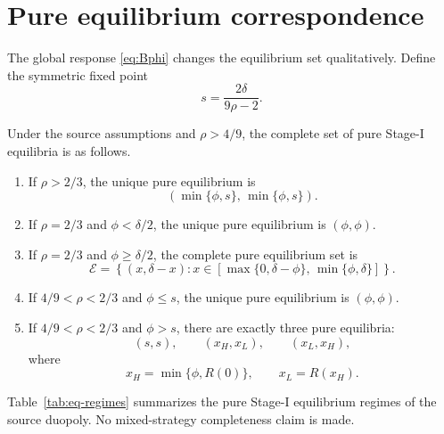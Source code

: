 \section{Pure equilibrium correspondence}
\label{sec:equilibrium}

The global response \eqref{eq:Bphi} changes the equilibrium set qualitatively.  Define the symmetric fixed point
\begin{equation}
s=\frac{2\delta}{9\rho-2}.
\label{eq:s}
\end{equation}

\begin{proposition}
\label{prop:correspondence}
Under the source assumptions and \(\rho>4/9\), the complete set of pure Stage-I equilibria is as follows.
\begin{enumerate}
\item If \(\rho>2/3\), the unique pure equilibrium is
\[
(\min\{\phi,s\},\,\min\{\phi,s\}).
\]
\item If \(\rho=2/3\) and \(\phi<\delta/2\), the unique pure equilibrium is \((\phi,\phi)\).
\item If \(\rho=2/3\) and \(\phi\ge\delta/2\), the complete pure equilibrium set is
\begin{equation}
\mathcal E=
\left\{
(x,\delta-x):
x\in[\max\{0,\delta-\phi\},\,\min\{\phi,\delta\}]
\right\}.
\label{eq:knife-continuum}
\end{equation}
\item If \(4/9<\rho<2/3\) and \(\phi\le s\), the unique pure equilibrium is \((\phi,\phi)\).
\item If \(4/9<\rho<2/3\) and \(\phi>s\), there are exactly three pure equilibria:
\begin{equation}
(s,s),\qquad(x_H,x_L),\qquad(x_L,x_H),
\label{eq:three-eq}
\end{equation}
where
\[
x_H=\min\{\phi,R(0)\},
\qquad
x_L=R(x_H).
\]
\end{enumerate}
\end{proposition}

Table~\ref{tab:eq-regimes} summarizes the pure Stage-I equilibrium regimes of the source duopoly.  No mixed-strategy completeness claim is made.

